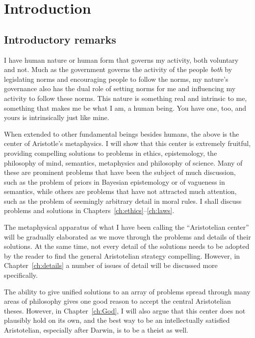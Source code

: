 \def\mychapter{I}

\chapter{Introduction}\label{ch:intro}
\section{Introductory remarks}
I have human nature or human form that governs my activity, both voluntary and not.
Much as the government governs the activity of the people \textit{both} by legislating norms and encouraging
people to follow the norms, my nature's governance also has the dual role of setting norms for me and influencing my
activity to follow these norms. This nature is something real and intrinsic to me, something that makes me be what I am, 
a human being. You have one, too, and yours is intrinsically just like mine.

When extended to other fundamental beings besides humans, the above is the center of Aristotle's metaphysics.
I will show that this center is extremely fruitful, providing compelling solutions to problems in ethics,
epistemology, the philosophy of mind, semantics, metaphysics and philosophy of science. Many of these are prominent problems that have been
the subject of much discussion, such as the problem of priors in Bayesian epistemology or of vagueness in semantics, while others 
are problems
that have not attracted much attention, such as the problem of seemingly arbitrary detail in moral rules. 
I shall discuss problems and solutions in Chapters~\ref{ch:ethics}--\ref{ch:laws}.

The metaphysical apparatus of what I have been calling the ``Aristotelian center'' will be gradually elaborated
as we move through the problems and details of their solutions. At the same time, not every detail of the solutions needs to be
adopted by the reader to find the general Aristotelian strategy compelling. However, in Chapter~\ref{ch:details} a number of 
issues of detail will be discussed more specifically.

The ability to give unified solutions to an array of problems spread through many areas of philosophy gives one
good reason to accept the central Aristotelian theses. However, in Chapter~\ref{ch:God}, I will also argue that this center does
not plausibly hold on its own, and the best way to be an intellectually satisfied Aristotelian, especially after Darwin, is to be a theist 
as well. 


